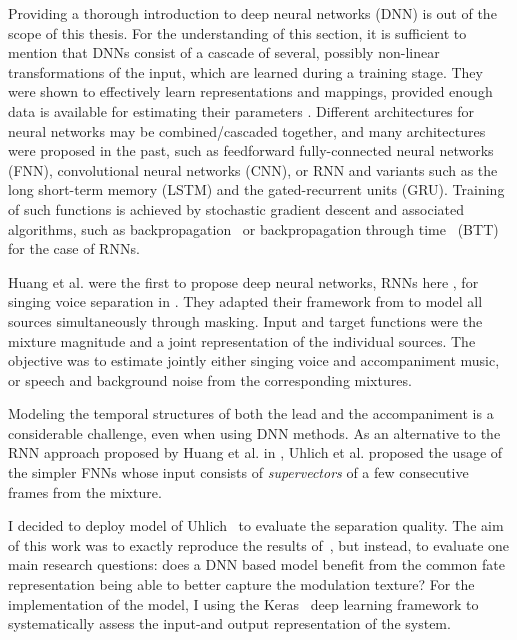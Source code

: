 Providing a thorough introduction to deep neural networks (DNN) is out of the scope of this thesis.
For the understanding of this section, it is sufficient to mention that DNNs consist of a cascade of several, possibly non-linear transformations of the input, which are learned during a training stage.
They were shown to effectively learn representations and mappings, provided enough data is available for estimating their parameters \cite{deng14, lecun15, goodfellow16}.
Different architectures for neural networks may be combined/cascaded together, and many architectures were proposed in the past, such as feedforward fully-connected neural networks (FNN), convolutional neural networks (CNN), or RNN and variants such as the long short-term memory (LSTM) and the gated-recurrent units (GRU).
Training of such functions is achieved by stochastic gradient descent \cite{robbins51} and associated algorithms, such as backpropagation~\cite{rumelhart862} or backpropagation through time~\cite{rumelhart86} (BTT) for the case of RNNs.
\par
Huang et al. were the first to propose deep neural networks, RNNs here \cite{hermans13,pascanu14}, for singing voice separation in \cite{huang14,huang15}. They adapted their framework from \cite{huang142} to model all sources simultaneously through masking. Input and target functions were the mixture magnitude and a joint representation of the individual sources. The objective was to estimate jointly either singing voice and accompaniment music, or speech and background noise from the corresponding mixtures.
\par
Modeling the temporal structures of both the lead and the accompaniment is a considerable challenge, even when using DNN methods. As an alternative to the RNN approach proposed by Huang et al. in \cite{huang14}, Uhlich et al. proposed the usage of the simpler FNNs \cite{uhlich15} whose input consists of \textit{supervectors} of a few consecutive frames from the mixture.
\par
I decided to deploy model of Uhlich~\cite{uhlich15} to evaluate the separation quality.
The aim of this work was to exactly reproduce the results of~\cite{uhlich15}, but instead, to evaluate one main research questions: does a DNN based model benefit from the common fate representation being able to better capture the modulation texture?
For the implementation of the model, I using the Keras~\cite{chollet15} deep learning framework to systematically assess the input-and output representation of the system.


